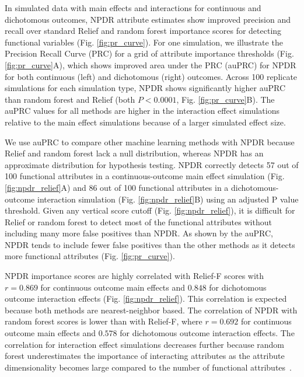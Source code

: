 \documentclass{bioinfo}
\begin{document}
In simulated data with main effects and interactions for continuous and dichotomous outcomes, NPDR attribute estimates show improved precision and recall over standard Relief and random forest importance scores for detecting functional variables (Fig. \ref{fig:pr_curve}).
For one simulation, we illustrate the Precision Recall Curve (PRC) for a grid of attribute importance thresholds (Fig. \ref{fig:pr_curve}A), which shows improved area under the PRC (auPRC) for NPDR for both continuous (left) and dichotomous (right) outcomes.
Across 100 replicate simulations for each simulation type, NPDR shows significantly higher auPRC than random forest and Relief (both $P < 0.0001$, Fig. \ref{fig:pr_curve}B).
The auPRC values for all methods are higher in the interaction effect simulations relative to the main effect simulations because of a larger simulated effect size.

We use auPRC to compare other machine learning methods with NPDR because Relief and random forest lack a null distribution, whereas NPDR has an approximate distribution for hypothesis testing.
NPDR correctly detects 57 out of 100 functional attributes in a continuous-outcome main effect simulation (Fig. \ref{fig:npdr_relief}A) and 86 out of 100 functional attributes in a dichotomous-outcome interaction simulation (Fig. \ref{fig:npdr_relief}B) using an adjusted P value threshold.
Given any vertical score cutoff (Fig. \ref{fig:npdr_relief}), it is difficult for Relief or random forest to detect most of the functional attributes without including many more false positives than NPDR.
As shown by the auPRC, NPDR tends to include fewer false positives than the other methods as it detects more functional attributes (Fig. \ref{fig:pr_curve}).

NPDR importance scores are highly correlated with Relief-F scores with $r = 0.869$ for continuous outcome main effects and $0.848$ for dichotomous outcome interaction effects (Fig. \ref{fig:npdr_relief}).
This correlation is expected because both methods are nearest-neighbor based.
The correlation of NPDR with random forest scores is lower than with Relief-F, where $r = 0.692$ for continuous outcome main effects and $0.578$ for dichotomous outcome interaction effects.
The correlation for interaction effect simulations decreases further because random forest underestimates the importance of interacting attributes as the attribute dimensionality becomes large compared to the number of functional attributes~\cite{mckinney2009capturing,winham2012snp}.
\end{document}
